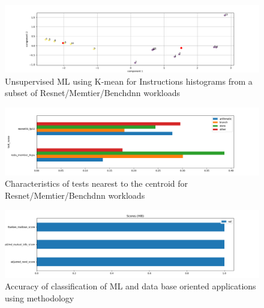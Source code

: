 \documentclass[]{PhDEngScITESO-R}
\begin{document}
\begin{figure}[h]
    \centering
    \includegraphics[width=\textwidth]{Reporte IDI-2 ITESO/img/k_means_apps.png}
    \caption{Unsupervised ML using K-mean for Instructions histograms from a subset of Resnet/Memtier/Benchdnn workloads }
    \label{fig:kmeans_apps}
\end{figure}

\begin{figure}[h]
    \centering
    \includegraphics[width=\textwidth]{Reporte IDI-2 ITESO/img/centroid_apps.png}
    \caption{Characteristics of tests nearest to the centroid for Resnet/Memtier/Benchdnn workloads }
    \label{fig:centroid_apps}
\end{figure}

\begin{figure}[h]
    \centering
    \includegraphics[width=\textwidth]{Reporte IDI-2 ITESO/img/results_apps.png}
    \caption{Accuracy of classification of ML and data base oriented applications using methodology}
    \label{fig:results_apps}
\end{figure}
\end{document}
